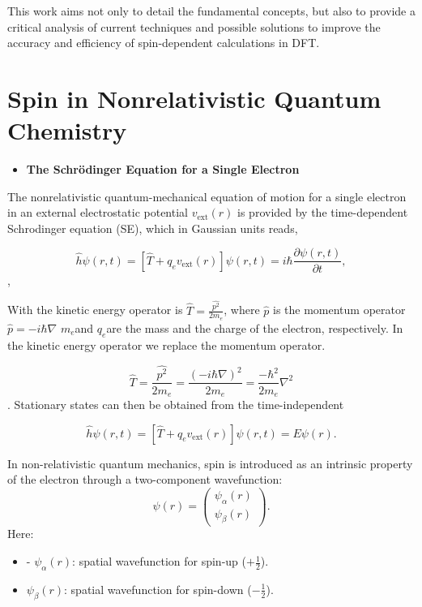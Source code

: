 \documentclass[%
 preprint, linenumbers,
 amsmath,amssymb,
 aps, physrev,
]{revtex4-2}
\begin{document}
This work aims not only to detail the fundamental concepts, but also to provide a critical analysis of current techniques and possible solutions to improve the accuracy and efficiency of spin-dependent calculations in DFT.



\section{Spin in Nonrelativistic Quantum Chemistry}

 \begin{itemize}
     \item \textbf{The Schrödinger Equation for a Single Electron}
 \end{itemize}
 The nonrelativistic quantum-mechanical equation of motion
 for a single electron in an external electrostatic potential \(v_{\text{ext}}(r)\)  is provided by the time-dependent Schrodinger equation (SE), which in Gaussian units reads, 

\begin{equation}
    \hat{h} \psi(r, t) = [ \hat{T} + q_e v_{\text{ext}}(r)]\psi(r, t)=i\hbar \frac{\partial \psi(r, t)}{\partial t},
\end{equation},

With the kinetic energy operator is 
 $\hat{T}= \frac{\hat{p^{2}}}{2m_{e}}$, where $\hat{p}$  is the momentum operator $\hat{p} =-i\hbar \nabla$ 
 $m_e $and $q_e $are the
 mass and the charge of the electron, respectively. 
In the kinetic energy operator we replace the momentum operator.

 $$\hat{T}= \frac{\hat{p^{2}}}{2m_{e}} =  \frac{(-i\hbar \nabla)^{2}}{2m_{e}} = \frac{-\hbar^{2} }{2m_{e}}\nabla^2  $$.
Stationary states can then be obtained from the time-independent

\begin{equation}
    \hat{h} \psi(r, t) = [ \hat{T} + q_e v_{\text{ext}}(r)]\psi(r, t)= E\psi(r).
\end{equation}



In non-relativistic quantum mechanics, spin is introduced as an intrinsic property of the electron through a two-component wavefunction:  
\[
\psi(r) = 
\begin{pmatrix}
\psi_\alpha(r) \\ 
\psi_\beta(r)
\end{pmatrix}.
\]
Here:
\begin{itemize}
    \item - \( \psi_\alpha(r) \): spatial wavefunction for spin-up (\( +\frac{1}{2} \)).
    \item \( \psi_\beta(r) \): spatial wavefunction for spin-down (\( -\frac{1}{2} \)).
    
\end{itemize}
\end{document}
